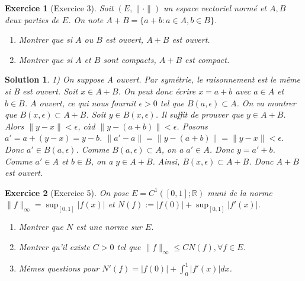 \documentclass{article}
\newtheorem{solution}{Solution}
\newtheorem{exercise}{Exercice} %
\begin{document}
\begin{exercise}[Exercice 3]
Soit $(E, \| \cdot \|)$ un espace vectoriel normé et $A, B$ deux parties de $E$. On note $A+B = \{a+b : a \in A, b \in B\}$.
\begin{enumerate}
    \item Montrer que si $A$ ou $B$ est ouvert, $A+B$ est ouvert.
    \item Montrer que si $A$ et $B$ sont compacts, $A+B$ est compact.
\end{enumerate}
\end{exercise}

\begin{solution}
1) On suppose A ouvert. Par symétrie, le raisonnement est le même si B est ouvert.
Soit $x \in A+B$. On peut donc écrire $x = a+b$ avec $a \in A$ et $b \in B$.
$A$ ouvert, ce qui nous fournit $\epsilon > 0$ tel que $B(a, \epsilon) \subset A$.
On va montrer que $B(x, \epsilon) \subset A+B$.
Soit $y \in B(x, \epsilon)$. Il suffit de prouver que $y \in A+B$.
Alors $\|y - x\| < \epsilon$, càd $\|y - (a+b)\| < \epsilon$.
Posons $a' = a + (y - x) = y - b$.
$\|a' - a\| = \|y - (a+b)\| = \|y-x\| < \epsilon$. Donc $a' \in B(a, \epsilon)$.
Comme $B(a, \epsilon) \subset A$, on a $a' \in A$.
Donc $y = a' + b$. Comme $a' \in A$ et $b \in B$, on a $y \in A+B$.
Ainsi, $B(x, \epsilon) \subset A+B$.
Donc $A+B$ est ouvert.
\end{solution}

\begin{exercise}[Exercice 5]
On pose $E = C^1([0, 1]; \mathbb{R})$ muni de la norme $\| f \|_\infty = \sup_{[0, 1]} |f(x)|$ et $N(f) := |f(0)| + \sup_{[0, 1]} |f'(x)|$.
\begin{enumerate}
    \item Montrer que $N$ est une norme sur $E$.
    \item Montrer qu'il existe $C > 0$ tel que $\| f \|_\infty \leq C N(f), \forall f \in E$.
    \item Mêmes questions pour $N'(f) = |f(0)| + \int_0^1 |f'(x)| dx$.
\end{enumerate}
\end{exercise}
\end{document}

